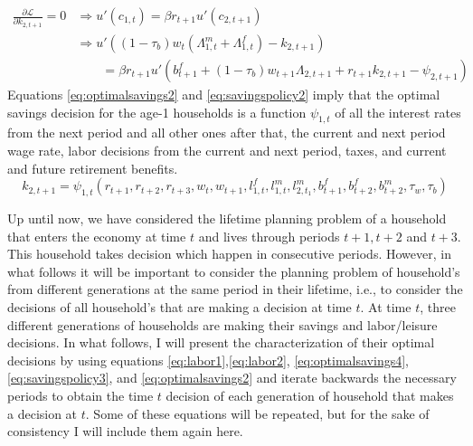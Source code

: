 \documentclass[BufferStockTheory]{subfiles}
\begin{document}
\begin{equation}
	\label{eq:optimalsavings2}
	\begin{aligned}
		\frac{\partial\mathcal{L}}{\partial k_{2,t+1}}=0 & \Rightarrow u'(c_{1,t})=\beta r_{t+1}
		u'(c_{2,t+1}) \\
		&\Rightarrow u'\left((1-\tau_b)w_t (\Lambda_{1,t}^m+\Lambda_{1,t}^f) -k_{2,t+1}\right) \\
		&\qquad = \beta r_{t+1}
		u'\left(b_{t+1}^f+(1-\tau_b)w_{t+1} \Lambda_{2,t+1} + r_{t+1}k_{2,t+1} -\psi_{2,t+1}\right)
\end{aligned}
\end{equation}
Equations \eqref{eq:optimalsavings2} and \eqref{eq:savingspolicy2} imply that the optimal savings decision for 
the age-1 households is a function $\psi_{1,t}$ of all the interest rates from the next period and all other ones after that, the current and next period wage rate, labor decisions from the current and next period, taxes, and current and future retirement benefits. 
\begin{equation}
 	\label{eq:savingspolicy1}
 	k_{2,t+1}= \psi_{1,t} (r_{t+1},r_{t+2},r_{t+3},w_t,w_{t+1},l_{1,t}^f,l_{1,t}^m,l_{2,t_1}^m, b_{t+1}^f,b_{t+2}^f,b_{t+2}^m, \tau_w,\tau_b)
 \end{equation} 

 Up until now, we have considered the lifetime planning problem of a household that enters the economy at time $t$ and lives through periods $t+1,t+2$ and $t+3.$ This household takes decision which happen in consecutive periods. However, in what follows it will be important to consider the planning problem of household's from different generations at the same period in their lifetime, i.e., to consider the decisions of all household's that are making a decision at time $t.$ At time $t$, three different generations of households are making their savings and labor/leisure decisions. In what follows, I will present the characterization of their optimal decisions by using equations \eqref{eq:labor1},\eqref{eq:labor2}, \eqref{eq:optimalsavings4},\eqref{eq:savingspolicy3}, and \eqref{eq:optimalsavings2} and iterate backwards the necessary periods to obtain the time $t$ decision of each generation of household that makes a decision at $t.$ Some of these equations will be repeated, but for the sake of consistency I will include them again here. 
\end{document}
